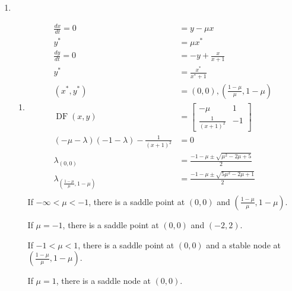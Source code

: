 \documentclass{article}
\begin{document}
\begin{enumerate}
\begin{enumerate}
\begin{enumerate}
\begin{pspicture}
				
			\end{pspicture}
		\end{enumerate}
		\item
		\begin{enumerate}
			\item 
			\begin{equation}
				\begin{split}
					\frac{dx}{dt} = 0 & = y - \mu x \\
					y^* & = \mu x^* \\
					\frac{dy}{dt} = 0 & = - y + \frac{x}{x + 1} \\
					y^* & = \frac{x^*}{x^* + 1} \\
					(x^*, y^*) & = (0,0), (\frac{1-\mu}{\mu},1-\mu) \\
					\operatorname{DF}(x,y) & = \begin{bmatrix} -\mu & 1 \\ \frac{1}{(x+1)^2} & -1\end{bmatrix} \\
					(-\mu-\lambda)(-1-\lambda) - \frac{1}{(x+1)^2} & = 0 \\
					\lambda_{(0,0)} & = \frac{-1-\mu\pm\sqrt{\mu^2-2\mu+5}}{2} \\
					\lambda_{(\frac{1-\mu}{\mu},1-\mu)} & = \frac{-1-\mu\pm\sqrt{5\mu^2-2\mu+1}}{2} \\
				\end{split}
			\end{equation}
			If $-\infty < \mu < -1$, there is a saddle point at $(0,0)$ and $(\frac{1-\mu}{\mu},1-\mu)$.
			
			If $\mu = -1$, there is a saddle point at $(0,0)$ and $(-2,2)$.
			
			If $-1 < \mu < 1$, there is a saddle point at $(0,0)$ and a stable node at $(\frac{1-\mu}{\mu},1-\mu)$.
			
			If $\mu = 1$, there is a saddle node at $(0,0)$.
			

\end{enumerate}
\end{enumerate}
\end{enumerate}
\end{document}
